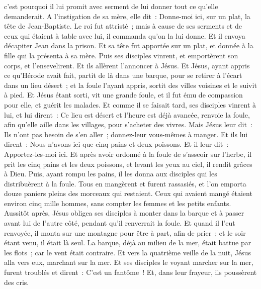 \begin{multicols}{2}
c'est pourquoi il lui promit avec serment de lui donner tout ce qu'elle demanderait.
A l'instigation de sa mère, elle dit~: Donne-moi ici, sur un plat, la tête de Jean-Baptiste.
Le roi fut attristé~; mais à cause de ses serments et de ceux qui étaient à table avec lui, il commanda qu'on la lui donne.
Et il envoya décapiter Jean dans la prison.
Et sa tête fut apportée sur un plat, et donnée à la fille qui la présenta à sa mère.
Puis ses disciples vinrent, et emportèrent son corps, et l'ensevelirent. Et ils allèrent l'annoncer à Jésus.
Et Jésus, ayant appris ce qu'Hérode avait fait, partit de là dans une barque, pour se retirer à l'écart dans un lieu désert~; et la foule l'ayant appris, sortit des villes voisines et le suivit à pied.
Et Jésus étant sorti, vit une grande foule, et il fut ému de compassion pour elle, et guérit les malades.
Et comme il se faisait tard, ses disciples vinrent à lui, et lui dirent~: Ce lieu est désert et l'heure est déjà avancée, renvoie la foule, afin qu'elle aille dans les villages, pour s'acheter des vivres.
Mais Jésus leur dit~: Ils n'ont pas besoin de s'en aller~; donnez-leur vous-mêmes à manger.
Et ils lui dirent~: Nous n'avons ici que cinq pains et deux poissons.
Et il leur dit~: Apportez-les-moi ici.
Et après avoir ordonné à la foule de s'asseoir sur l'herbe, il prit les cinq pains et les deux poissons, et levant les yeux au ciel, il rendit grâces à Dieu. Puis, ayant rompu les pains, il les donna aux disciples qui les distribuèrent à la foule.
Tous en mangèrent et furent rassasiés, et l'on emporta douze paniers pleins des morceaux qui restaient.
Ceux qui avaient mangé étaient environ cinq mille hommes, sans compter les femmes et les petits enfants.
Aussitôt après, Jésus obligea ses disciples à monter dans la barque et à passer avant lui de l'autre côté, pendant qu'il renverrait la foule.
Et quand il l'eut renvoyée, il monta sur une montagne pour être à part, afin de prier~; et le soir étant venu, il était là seul.
La barque, déjà au milieu de la mer, était battue par les flots~; car le vent était contraire.
Et vers la quatrième veille de la nuit, Jésus alla vers eux, marchant sur la mer.
Et ses disciples le voyant marcher sur la mer, furent troublés et dirent~: C'est un fantôme~! Et, dans leur frayeur, ils poussèrent des cris.

\end{multicols}
